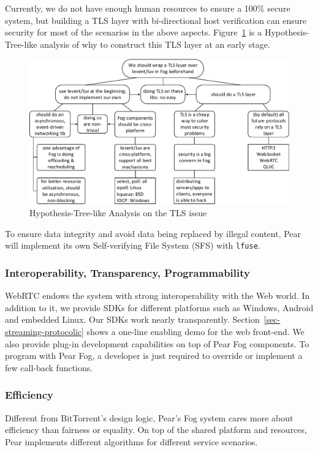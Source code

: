 Currently, we do not have enough human resources to ensure a 100\% secure system, but building a TLS layer with bi-directional host verification can ensure security for most of the scenarios in the above aspects. Figure~\ref{fig:TLS-hypo} is a Hypothesis-Tree-like analysis of why to construct this TLS layer at an early stage.  

\begin{figure}[htbp]
	\centering
	\includegraphics[width=1.00\textwidth]{fig/decisions/tls-hypothesis.pdf}
	\caption{Hypothesis-Tree-like Analysis on the TLS issue}\label{fig:TLS-hypo}
\end{figure}

To ensure data integrity and avoid data being replaced by illegal content, Pear will implement its own Self-verifying File System (SFS) with \texttt{lfuse}. 

\subsubsection{Interoperability, Transparency, Programmability}
WebRTC endows the system with strong interoperability with the Web world. In addition to it, we provide SDKs for different platforms such as Windows, Android and embedded Linux. 
Our SDKs work nearly transparently. Section~\ref{sec-streaming-protocolic} shows a one-line enabling demo for the web front-end. 
We also provide plug-in development capabilities on top of Pear Fog components. To program with Pear Fog, a developer is just required to override or implement a few call-back functions. 

\subsubsection{Efficiency}
Different from BitTorrent's design logic, Pear's Fog system cares more about efficiency than fairness or equality. 
On top of the shared platform and resources, Pear implements different algorithms for different service scenarios. 

